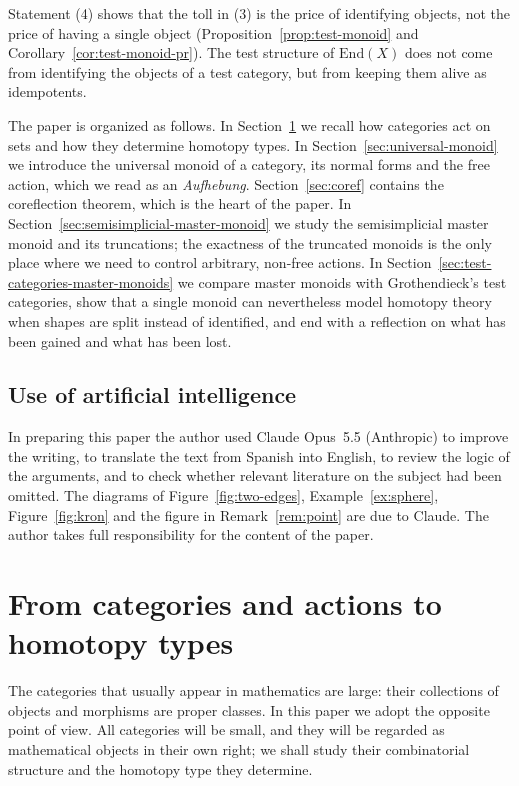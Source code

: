 \documentclass[11pt]{amsart}
\theoremstyle{definition}
\theoremstyle{remark}
\numberwithin{figure}{section}%
\begin{document}
Statement (4) shows that the toll in (3) is the price of identifying objects, not the price of having a single object (Proposition~\ref{prop:test-monoid} and Corollary~\ref{cor:test-monoid-pr}). The test structure of $\mathrm{End}(X)$ does not come from identifying the objects of a test category, but from keeping them alive as idempotents.

The paper is organized as follows. In Section~\ref{sec:categories-topological-combinatorial} we recall how categories act on sets and how they determine homotopy types. In Section~\ref{sec:universal-monoid} we introduce the universal monoid of a category, its normal forms and the free action, which we read as an \emph{Aufhebung}. Section~\ref{sec:coref} contains the coreflection theorem, which is the heart of the paper. In Section~\ref{sec:semisimplicial-master-monoid} we study the semisimplicial master monoid and its truncations; the exactness of the truncated monoids is the only place where we need to control arbitrary, non-free actions. In Section~\ref{sec:test-categories-master-monoids} we compare master monoids with Grothendieck's test categories, show that a single monoid can nevertheless model homotopy theory when shapes are split instead of identified, and end with a reflection on what has been gained and what has been lost.

\subsection*{Use of artificial intelligence} 
In preparing this paper the author used Claude Opus~5.5 (Anthropic) to improve the writing, to translate the text from Spanish into English, to review the logic of the arguments, and to check whether relevant literature on the subject had been omitted. The diagrams of Figure~\ref{fig:two-edges}, Example~\ref{ex:sphere}, Figure~\ref{fig:kron} and the figure in Remark~\ref{rem:point} are due to Claude. The author takes full responsibility for the content of the paper.

\section{From categories and actions to homotopy types}
\label{sec:categories-topological-combinatorial}

The categories that usually appear in mathematics are large: their collections of objects and morphisms are proper classes. In this paper we adopt the opposite point of view. All categories will be small, and they will be regarded as mathematical objects in their own right; we shall study their combinatorial structure and the homotopy type they determine.
\end{document}
